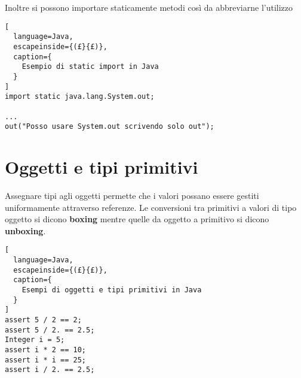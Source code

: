 Inoltre si possono importare staticamente metodi così da abbreviarne l'utilizzo
\begin{lstlisting}[
  language=Java,
  escapeinside={(£}{£)},
  caption={
    Esempio di static import in Java
  }
]
import static java.lang.System.out;

...
out("Posso usare System.out scrivendo solo out");
\end{lstlisting}

\section{Oggetti e tipi primitivi}
Assegnare tipi agli oggetti permette che i valori possano essere gestiti
uniformamente attraverso referenze.
Le conversioni tra primitivi a valori di tipo oggetto si dicono \textbf{boxing}
mentre quelle da oggetto a primitivo si dicono \textbf{unboxing}.

\begin{lstlisting}[
  language=Java,
  escapeinside={(£}{£)},
  caption={
    Esempi di oggetti e tipi primitivi in Java
  }
]
assert 5 / 2 == 2;
assert 5 / 2. == 2.5;
Integer i = 5;
assert i * 2 == 10;
assert i * i == 25;
assert i / 2. == 2.5;
\end{lstlisting}
